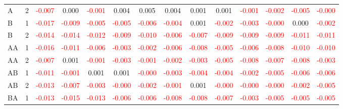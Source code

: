 \begin{table}[!htb]
{\begin{tabular}{llcccccccccccc}
A & 2 & \textcolor{red}{-0.007} & 0.000 & \textcolor{red}{-0.001} & 0.004 & 0.005 & 0.004 & 0.001 & 0.001 & \textcolor{red}{-0.001} & \textcolor{red}{-0.002} & \textcolor{red}{-0.005} & \textcolor{red}{-0.000}\\
B & 1 & \textcolor{red}{-0.017} & \textcolor{red}{-0.009} & \textcolor{red}{-0.005} & \textcolor{red}{-0.005} & \textcolor{red}{-0.006} & \textcolor{red}{-0.004} & 0.001 & \textcolor{red}{-0.002} & \textcolor{red}{-0.003} & \textcolor{red}{-0.000} & 0.000 & \textcolor{red}{-0.002}\\
B & 2 & \textcolor{red}{-0.014} & \textcolor{red}{-0.014} & \textcolor{red}{-0.012} & \textcolor{red}{-0.009} & \textcolor{red}{-0.010} & \textcolor{red}{-0.006} & \textcolor{red}{-0.007} & \textcolor{red}{-0.009} & \textcolor{red}{-0.009} & \textcolor{red}{-0.009} & \textcolor{red}{-0.011} & \textcolor{red}{-0.011}\\
AA & 1 & \textcolor{red}{-0.016} & \textcolor{red}{-0.011} & \textcolor{red}{-0.006} & \textcolor{red}{-0.003} & \textcolor{red}{-0.002} & \textcolor{red}{-0.006} & \textcolor{red}{-0.008} & \textcolor{red}{-0.005} & \textcolor{red}{-0.006} & \textcolor{red}{-0.008} & \textcolor{red}{-0.010} & \textcolor{red}{-0.010}\\
AA & 2 & \textcolor{red}{-0.007} & 0.001 & \textcolor{red}{-0.001} & \textcolor{red}{-0.003} & \textcolor{red}{-0.001} & \textcolor{red}{-0.002} & \textcolor{red}{-0.003} & \textcolor{red}{-0.005} & \textcolor{red}{-0.008} & \textcolor{red}{-0.007} & \textcolor{red}{-0.008} & \textcolor{red}{-0.003}\\
AB & 1 & \textcolor{red}{-0.011} & \textcolor{red}{-0.001} & 0.001 & 0.001 & \textcolor{red}{-0.000} & \textcolor{red}{-0.003} & \textcolor{red}{-0.004} & \textcolor{red}{-0.004} & \textcolor{red}{-0.002} & \textcolor{red}{-0.005} & \textcolor{red}{-0.006} & \textcolor{red}{-0.006}\\
AB & 2 & \textcolor{red}{-0.013} & \textcolor{red}{-0.007} & \textcolor{red}{-0.003} & \textcolor{red}{-0.000} & \textcolor{red}{-0.002} & \textcolor{red}{-0.001} & 0.001 & \textcolor{red}{-0.000} & \textcolor{red}{-0.000} & \textcolor{red}{-0.000} & \textcolor{red}{-0.002} & \textcolor{red}{-0.005}\\
BA & 1 & \textcolor{red}{-0.013} & \textcolor{red}{-0.015} & \textcolor{red}{-0.013} & \textcolor{red}{-0.006} & \textcolor{red}{-0.006} & \textcolor{red}{-0.008} & \textcolor{red}{-0.008} & \textcolor{red}{-0.007} & \textcolor{red}{-0.003} & \textcolor{red}{-0.005} & \textcolor{red}{-0.005} & \textcolor{red}{-0.005}\\

\end{tabular}}
\end{table}
